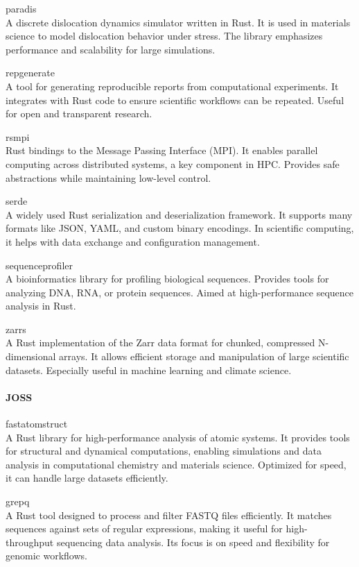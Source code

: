 \documentclass{article}
\begin{document}
paradis\\
A discrete dislocation dynamics simulator written in Rust. It is used in materials
science to model dislocation behavior under stress. The library emphasizes performance and
scalability for large simulations.

repgenerate\\
A tool for generating reproducible reports from computational experiments. It
integrates with Rust code to ensure scientific workflows can be repeated. Useful for open and
transparent research.

rsmpi\\
Rust bindings to the Message Passing Interface (MPI). It enables parallel computing across
distributed systems, a key component in HPC. Provides safe abstractions while maintaining low-level
control.

serde\\
A widely used Rust serialization and deserialization framework. It supports many formats
like JSON, YAML, and custom binary encodings. In scientific computing, it helps with data exchange
and configuration management.

sequenceprofiler\\
A bioinformatics library for profiling biological sequences. Provides tools for
analyzing DNA, RNA, or protein sequences. Aimed at high-performance sequence analysis in Rust.

zarrs\\
A Rust implementation of the Zarr data format for chunked, compressed N-dimensional arrays.
It allows efficient storage and manipulation of large scientific datasets. Especially useful in
machine learning and climate science.

\paragraph{JOSS}

fastatomstruct\\
A Rust library for high-performance analysis of atomic systems. It provides tools
for structural and dynamical computations, enabling simulations and data analysis in computational
chemistry and materials science. Optimized for speed, it can handle large datasets efficiently.

grepq\\
A Rust tool designed to process and filter FASTQ files efficiently. It matches sequences
against sets of regular expressions, making it useful for high-throughput sequencing data analysis.
Its focus is on speed and flexibility for genomic workflows.
\end{document}
